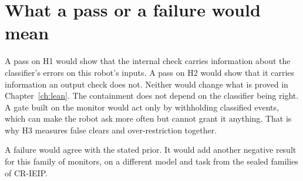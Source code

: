 


\section{What a pass or a failure would mean}

A pass on H1 would show that the internal check carries information about the classifier's
errors on this robot's inputs.
A pass on H2 would show that it carries information an output check does not.
Neither would change what is proved in Chapter~\ref{ch:lean}.
The containment does not depend on the classifier being right.
A gate built on the monitor would act only by withholding classified events, which can make the
robot ask more often but cannot grant it anything.
That is why H3 measures false clears and over-restriction together.

A failure would agree with the stated prior.
It would add another negative result for this family of monitors, on a different model and
task from the sealed families of CR-IEIP.

